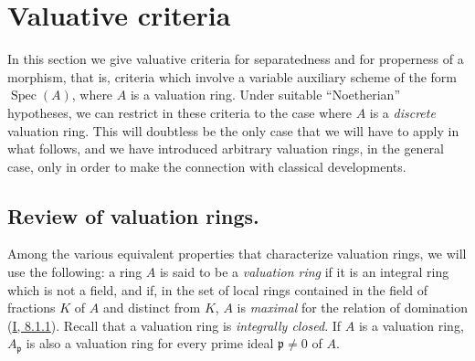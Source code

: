 \section{Valuative criteria}
\label{section:II.7}

In this section we give valuative criteria for separatedness and for
properness of a morphism, that is, criteria which involve a variable auxiliary
scheme of the form $\operatorname{Spec}(A)$, where $A$ is
a valuation ring. Under suitable ``Noetherian'' hypotheses, we can
restrict in these criteria to the case where $A$ is a \emph{discrete}
valuation ring. This will doubtless be the only case that we will
have to apply in what follows, and we have introduced arbitrary valuation
rings, in the general case, only in order to make the connection with
classical developments.

\subsection{Review of valuation rings.}
\label{subsection:II.7.1}

\begin{env}[7.1.1]
\label{II.7.1.1}
Among the various equivalent properties that characterize valuation
rings, we will use the following: a ring $A$ is said to be a
\emph{valuation ring} if it is an integral ring which is not a
field, and if, in the set of local rings contained in the field of
fractions $K$ of $A$ and distinct from $K$, $A$ is \emph{maximal} for the
relation of domination (\hyperref[I.8.1.1]{I, 8.1.1}). Recall that a
valuation ring is \emph{integrally closed}. If $A$ is a valuation ring,
$A_{\mathfrak{p}}$ is also a valuation ring for every prime ideal
$\mathfrak{p}\neq0$ of $A$.
\end{env}

